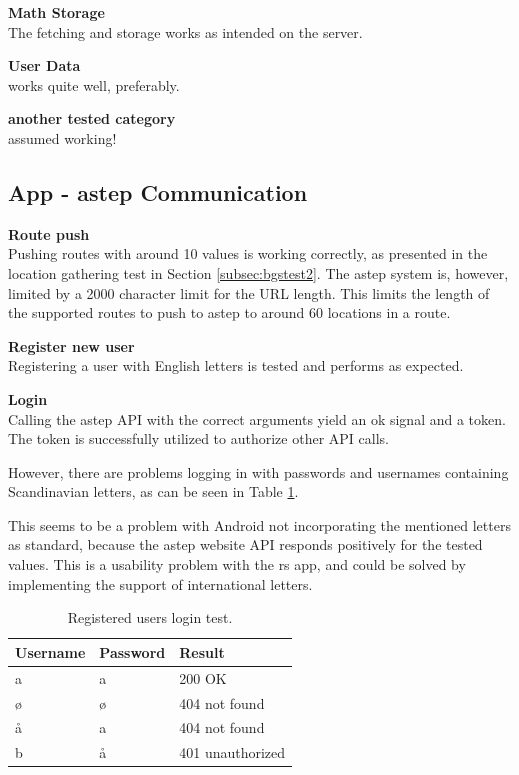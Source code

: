 \textbf{Math Storage}\\
The fetching and storage works as intended on the server. 

\textbf{User Data}\\
works quite well, preferably.

\textbf{another tested category}\\
assumed working!


\subsection{App - \gls{astep} Communication}
\textbf{Route push}\\
Pushing routes with around 10 values is working correctly, as presented in the location gathering test in Section \ref{subsec:bgstest2}.
The \gls{astep} system is, however, limited by a 2000 character limit for the URL length.
This limits the length of the supported routes to push to \gls{astep} to around 60 locations in a route.

\textbf{Register new user}\\
Registering a user with English letters is tested and performs as expected.

\textbf{Login}\\
Calling the \gls{astep} API with the correct arguments yield an ok signal and a token.
The token is successfully utilized to authorize other API calls.

However, there are problems logging in with passwords and usernames containing Scandinavian letters, as can be seen in Table \ref{tab:logintest}.

This seems to be a problem with Android not incorporating the mentioned letters as standard, because the \gls{astep} website API responds positively for the tested values.
This is a usability problem with the \gls{rs} app, and could be solved by implementing the support of international letters.

\begin{table}[!ht]
	\centering
	\begin{tabular}{@{}lll@{}}
		Username & Password & Result \\
		\hline
		a & a & 200 OK\\
		ø & ø & 404 not found\\
		å & a & 404 not found\\
		b & å & 401 unauthorized\\
	\end{tabular}
	\caption{Registered users login test.}
	\label{tab:logintest}
\end{table}


